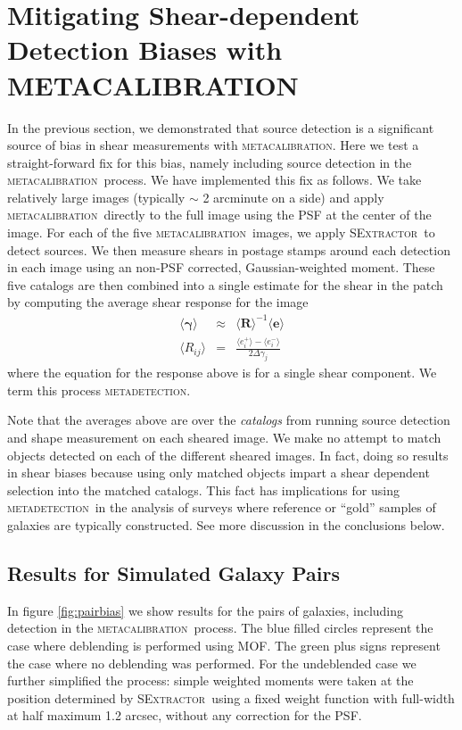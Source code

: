 \documentclass[fleqn,useAMS,usenatbib]{mnras}
\newcommand{\mcal}{\textsc{metacalibration}}
\newcommand{\mdet}{\textsc{metadetection}}
\newcommand{\sx}{\textsc{SExtractor}}
\begin{document}
\section{Mitigating Shear-dependent Detection Biases with \textsc{METACALIBRATION}}
\label{sec:mitigate}

In the previous section, we demonstrated that source detection is a significant
source of bias in shear measurements with \mcal. Here we test a straight-forward
fix for this bias, namely including source detection in the \mcal\ process. We
have implemented this fix as follows. We take relatively large images (typically
$\sim$ 2 arcminute on a side) and apply \mcal\ directly to the full image using the
PSF at the center of the image. For each of the five \mcal\ images, we apply
\sx\ to detect sources. We then measure shears in postage stamps around each
detection in each image using an non-PSF corrected, Gaussian-weighted moment.
These five catalogs are then combined into a single estimate for the shear in
the patch by computing the average shear response for the image
\begin{eqnarray}
\langle \boldsymbol\gamma \rangle &\approx& \langle \boldsymbol{R}\rangle^{-1}\langle\boldsymbol{e}\rangle\\
\langle R_{ij}\rangle &=& \frac{\langle e_i^{+}\rangle - \langle e_i^{-}\rangle}{2\Delta\gamma_j}
\end{eqnarray}
where the equation for the response above is for a single shear component. We term this
process \mdet.

Note that the averages above are over the {\it catalogs} from running source
detection and shape measurement on each sheared image. We make no attempt to
match objects detected on each of the different sheared images. In fact, doing
so results in shear biases because using only matched objects impart a shear
dependent selection into the matched catalogs. This fact has implications for
using \mdet\ in the analysis of surveys where reference or ``gold'' samples of
galaxies are typically constructed. See more discussion in the conclusions
below.

\subsection{Results for Simulated Galaxy Pairs}
\label{sec:mdetpairs}

In figure \ref{fig:pairbias} we show results for the pairs of galaxies, including
detection in the \mcal\ process. The blue filled circles represent the case
where deblending is performed using MOF. The green plus signs represent the
case where no deblending was performed. For the undeblended case we further
simplified the process: simple weighted moments were taken at the position
determined by \sx\ using a fixed weight function with full-width at half
maximum 1.2 arcsec, without any correction for the PSF.
\end{document}
